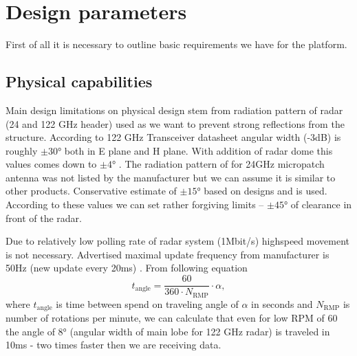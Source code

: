 \def\PageLayout{single-no-print}
\def\DocLanguage{en}
\def\PackagesIncludeTikz{yes}
\def\PackagesIncludeBib{yes}








\newcommand{\sidar}{SiRad Easy\textsuperscript{\copyright}}







\tableofcontents

\newpage
{}
\setcounter{page}{1}


\pagestyle{fancy}


\chapter{Design parameters}

First of all it is necessary to outline basic requirements we have for the platform.

\section{Physical capabilities}

Main design limitations on physical design stem from radiation pattern of radar (24 and 122 GHz header) used as we want to prevent strong reflections from the structure.
According to 122 GHz Transceiver datasheet angular width (-3dB) is roughly $\pm30\text{°}$\cite{sidarTRX} both in E plane and H plane.
With addition of radar dome this values comes down to $\pm4\text{°}$ \cite{sidarMAN}.
The radiation pattern of for 24GHz micropatch antenna was not listed by the manufacturer but we can assume it is similar to other products.
Conservative estimate of $\pm15\text{°}$ based on designs \cite{patch1} and \cite{patch2} is used.
According to these values we can set rather forgiving limits -- $\pm45\text{°}$ of clearance in front of the radar.


Due to relatively low polling rate of radar system (1Mbit/s) highspeed movement is not necessary.
Advertised maximal update frequency from manufacturer is  50Hz (new update every 20ms) \cite{sidarMAN}.
From following equation
%
\begin{equation}
  t_{\mathrm{angle}} = \frac{60}{360\cdot N_{\mathrm{RMP}}} \cdot  \alpha,
  \label{eq:poll}
\end{equation}
%
where $t_{\mathrm{angle}}$ is time between spend on traveling angle of $\alpha $ in seconds and $N_{\mathrm{RMP}}$ is number of rotations per minute, we can calculate that even for low RPM of 60 the angle of 8° (angular width of main lobe for 122 GHz radar) is traveled in 10ms - two times faster then we are receiving data.






